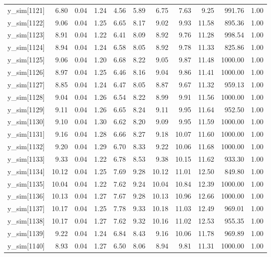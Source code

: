 \begin{table}[ht]
\begin{tabular}{rrrrrrrrrrr}
  y\_sim[1121] & 6.80 & 0.04 & 1.24 & 4.56 & 5.89 & 6.75 & 7.63 & 9.25 & 991.76 & 1.00 \\ 
  y\_sim[1122] & 9.06 & 0.04 & 1.25 & 6.65 & 8.17 & 9.02 & 9.93 & 11.58 & 895.36 & 1.00 \\ 
  y\_sim[1123] & 8.91 & 0.04 & 1.22 & 6.41 & 8.09 & 8.92 & 9.76 & 11.28 & 998.54 & 1.00 \\ 
  y\_sim[1124] & 8.94 & 0.04 & 1.24 & 6.58 & 8.05 & 8.92 & 9.78 & 11.33 & 825.86 & 1.00 \\ 
  y\_sim[1125] & 9.06 & 0.04 & 1.20 & 6.68 & 8.22 & 9.05 & 9.87 & 11.48 & 1000.00 & 1.00 \\ 
  y\_sim[1126] & 8.97 & 0.04 & 1.25 & 6.46 & 8.16 & 9.04 & 9.86 & 11.41 & 1000.00 & 1.00 \\ 
  y\_sim[1127] & 8.85 & 0.04 & 1.24 & 6.47 & 8.05 & 8.87 & 9.67 & 11.32 & 959.13 & 1.00 \\ 
  y\_sim[1128] & 9.04 & 0.04 & 1.26 & 6.54 & 8.22 & 8.99 & 9.91 & 11.56 & 1000.00 & 1.00 \\ 
  y\_sim[1129] & 9.11 & 0.04 & 1.26 & 6.65 & 8.24 & 9.11 & 9.95 & 11.64 & 952.50 & 1.00 \\ 
  y\_sim[1130] & 9.10 & 0.04 & 1.30 & 6.62 & 8.20 & 9.09 & 9.95 & 11.59 & 1000.00 & 1.00 \\ 
  y\_sim[1131] & 9.16 & 0.04 & 1.28 & 6.66 & 8.27 & 9.18 & 10.07 & 11.60 & 1000.00 & 1.00 \\ 
  y\_sim[1132] & 9.20 & 0.04 & 1.29 & 6.70 & 8.33 & 9.22 & 10.06 & 11.68 & 1000.00 & 1.00 \\ 
  y\_sim[1133] & 9.33 & 0.04 & 1.22 & 6.78 & 8.53 & 9.38 & 10.15 & 11.62 & 933.30 & 1.00 \\ 
  y\_sim[1134] & 10.12 & 0.04 & 1.25 & 7.69 & 9.28 & 10.12 & 11.01 & 12.50 & 849.80 & 1.00 \\ 
  y\_sim[1135] & 10.04 & 0.04 & 1.22 & 7.62 & 9.24 & 10.04 & 10.84 & 12.39 & 1000.00 & 1.00 \\ 
  y\_sim[1136] & 10.13 & 0.04 & 1.27 & 7.67 & 9.28 & 10.13 & 10.96 & 12.66 & 1000.00 & 1.00 \\ 
  y\_sim[1137] & 10.17 & 0.04 & 1.25 & 7.78 & 9.33 & 10.18 & 11.03 & 12.49 & 969.01 & 1.00 \\ 
  y\_sim[1138] & 10.17 & 0.04 & 1.27 & 7.62 & 9.32 & 10.16 & 11.02 & 12.53 & 955.35 & 1.00 \\ 
  y\_sim[1139] & 9.22 & 0.04 & 1.24 & 6.84 & 8.43 & 9.16 & 10.06 & 11.78 & 969.89 & 1.00 \\ 
  y\_sim[1140] & 8.93 & 0.04 & 1.27 & 6.50 & 8.06 & 8.94 & 9.81 & 11.31 & 1000.00 & 1.00 \\ 

\end{tabular}
\end{table}
